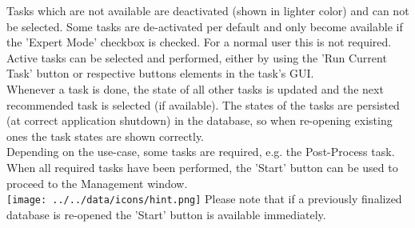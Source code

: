 Tasks which are not available are deactivated (shown in lighter color) and can not be selected. Some tasks are de-activated per default and only become available if the 'Expert Mode' checkbox is checked. For a normal user this is not required.\\

Active tasks can be selected and performed, either by using the 'Run Current Task' button or respective buttons elements in the task's GUI. \\

Whenever a task is done, the state of all other tasks is updated and the next recommended task is selected (if available). The states of the tasks are persisted (at correct application shutdown) in the database, so when re-opening existing ones the task states are shown correctly. \\

Depending on the use-case, some tasks are required, e.g. the Post-Process task. When all required tasks have been performed, the 'Start' button can be used to proceed to the Management window. \\

\texttt{[image: ../../data/icons/hint.png]} Please note that if a previously finalized database is re-opened the 'Start' button is available immediately.

























